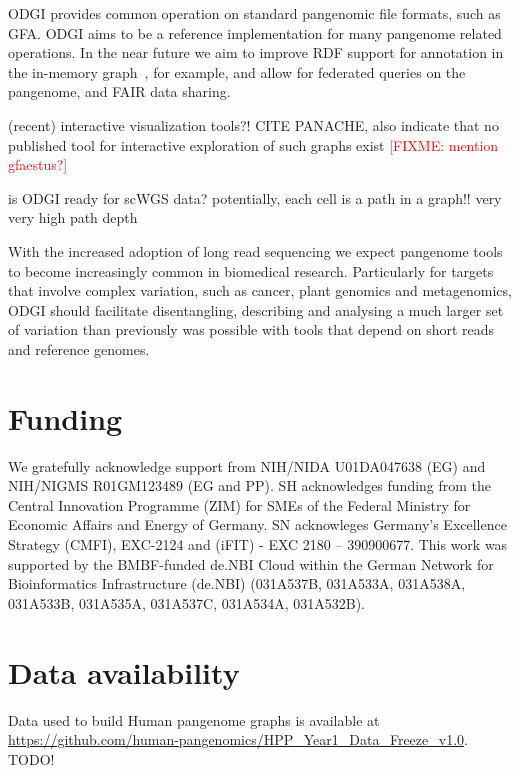 \documentclass{bioinfo}
\newcommand{\red}[1]{{\textcolor{Red}{#1}}}
\newcommand{\FIXME}[1]{\red{[FIXME: #1]}}
\begin{document}
ODGI provides common operation on standard pangenomic file formats, such as GFA. ODGI aims to be a reference implementation for many pangenome related operations. In the near future we aim to improve RDF support for annotation in the in-memory graph~\citep{Yokoyama2020}, for example, and allow for federated queries on the pangenome, and FAIR data sharing.

(recent) interactive visualization tools?! CITE PANACHE, also indicate that no published tool for interactive exploration of such graphs exist
\FIXME{mention gfaestus?}

is ODGI ready for scWGS data? potentially, each cell is a path in a graph!! very very high path depth

With the increased adoption of long read sequencing we expect pangenome tools to become increasingly common in biomedical research. Particularly for targets that involve complex variation, such as cancer, plant genomics and metagenomics, ODGI should facilitate disentangling, describing and analysing a much larger set of variation than previously was possible with tools that depend on short reads and reference genomes.

\section*{Funding}

We gratefully acknowledge support from NIH/NIDA U01DA047638 (EG) and NIH/NIGMS R01GM123489 (EG and PP).
SH acknowledges funding from the Central Innovation Programme (ZIM) for SMEs of the Federal Ministry for Economic Affairs and Energy of Germany. SN acknowleges Germany’s Excellence Strategy (CMFI), EXC-2124 and (iFIT) - EXC 2180 – 390900677.
This work was supported by the BMBF-funded de.NBI Cloud within the German Network for Bioinformatics Infrastructure (de.NBI) (031A537B, 031A533A, 031A538A, 031A533B, 031A535A, 031A537C, 031A534A, 031A532B).

\section*{Data availability}

Data used to build Human pangenome graphs is available at \url{https://github.com/human-pangenomics/HPP_Year1_Data_Freeze_v1.0}.
TODO!


%
%
%
%
%
%
%

\end{document}
